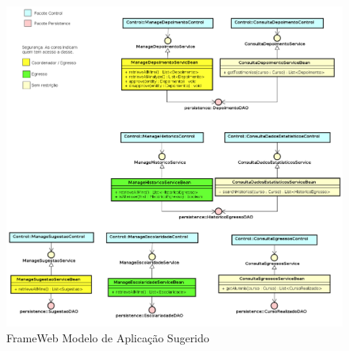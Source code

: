 \begin{figure}[h]
	\centering
	\includegraphics[width=1\textwidth]{figuras/modeloAplicacaoSugerido}
	\caption{FrameWeb Modelo de Aplicação Sugerido}
	\label{fig-modelo-aplicacao-sugerido}
\end{figure}